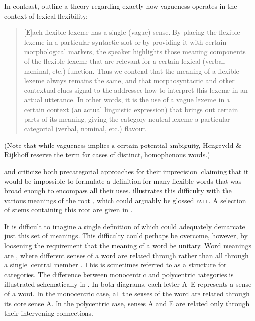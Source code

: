 In contrast, \textcite[539--541]{HengeveldRijkhoffSiewierska2004} outline a theory regarding exactly how vagueness operates in the context of lexical flexibility:

\blockquote[{\cite[541]{HengeveldRijkhoff2005}}]{[E]ach flexible lexeme has a single (vague) sense. By placing the flexible lexeme in a particular syntactic slot or by providing it with certain morphological markers, the speaker highlights those meaning components of the flexible lexeme that are relevant for a certain lexical (verbal, nominal, etc.) function. Thus we contend that the meaning of a flexible lexeme always remains the same, and that morphosyntactic and other contextual clues signal to the addressee how to interpret this lexeme in an actual utterance. In other words, it is the use of a vague lexeme in a certain context (an actual linguistic expression) that brings out certain parts of its meaning, giving the category-neutral lexeme a particular categorial (verbal, nominal, etc.) flavour.}

\noindent (Note that while vagueness implies a certain potential ambiguity, Hengeveld \& Rijkhoff reserve the term  for cases of distinct, homophonous words.)

\textcite[363--364]{EvansOsada2005} and \textcite{Kihm2017} criticize both precategorial approaches for their imprecision, claiming that it would be impossible to formulate a definition for many flexible words that was broad enough to encompass all their uses. \textcite[87]{Kihm2017} illustrates this difficulty with the various meanings of the  root , which could arguably be glossed \textsc{fall}. A selection of stems containing this root are given in .


It is difficult to imagine a single definition of  which could adequately demarcate just this set of meanings. This difficulty could perhaps be overcome, however, by loosening the requirement that the meaning of a word be unitary. Word meanings are , where different senses of a word are related through  rather than all through a single, central member \parencite[110]{Taylor2003}. This is sometimes referred to as a  structure for categories. The difference between monocentric and polycentric categories is illustrated schematically in . In both diagrams, each letter A–E represents a sense of a word. In the monocentric case, all the senses of the word are related through its core sense A. In the polycentric case, senses A and E are related only through their intervening connections.

